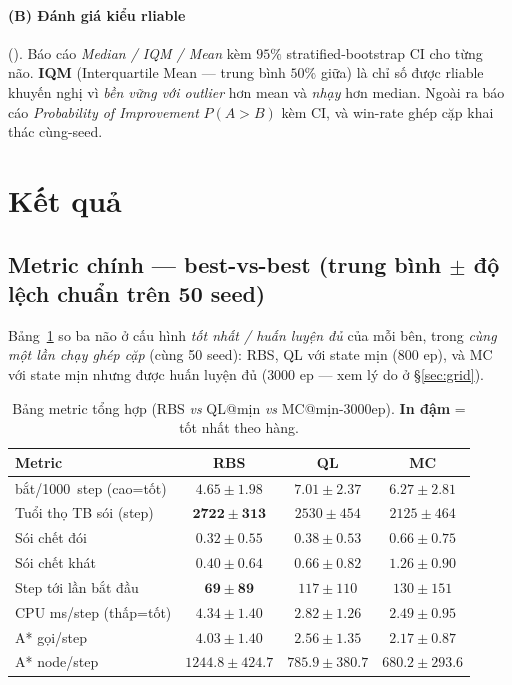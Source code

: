 \documentclass[11pt,a4paper]{article}
\newcommand{\code}[1]{\texttt{\detokenize{#1}}}
\newcommand{\catk}{bắt/1000}
\begin{document}
\paragraph{(B) Đánh giá kiểu rliable} \cite{agarwal2021rliable} (\code{stats_rliable.py}).
Báo cáo \emph{Median / IQM / Mean} kèm $95\%$ stratified-bootstrap CI cho từng não. \textbf{IQM}
(Interquartile Mean --- trung bình $50\%$ giữa) là chỉ số được rliable khuyến nghị vì \emph{bền
vững với outlier} hơn mean và \emph{nhạy} hơn median. Ngoài ra báo cáo \emph{Probability of
Improvement} $P(A>B)$ kèm CI, và win-rate ghép cặp khai thác cùng-seed.

\section{Kết quả}\label{sec:results}

\subsection{Metric chính --- best-vs-best (trung bình $\pm$ độ lệch chuẩn trên 50 seed)}

Bảng~\ref{tab:main} so ba não ở cấu hình \emph{tốt nhất / huấn luyện đủ} của mỗi bên, trong
\emph{cùng một lần chạy ghép cặp} (cùng 50 seed): RBS, QL với state mịn ($800$ ep), và MC với state
mịn nhưng được huấn luyện đủ ($3000$ ep --- xem lý do ở \S\ref{sec:grid}).

\begin{table}[h]
\centering
\caption{Bảng metric tổng hợp (RBS \emph{vs} QL@mịn \emph{vs} MC@mịn-$3000$ep). \textbf{In đậm} = tốt nhất theo hàng.}
\label{tab:main}
\small
\begin{tabular}{lccc}
\toprule
Metric & RBS & QL & MC \\
\midrule
\catk\ step (cao=tốt)   & $4.65\pm1.98$ & $\mathbf{7.01\pm2.37}$ & $6.27\pm2.81$ \\
Tuổi thọ TB sói (step)  & $\mathbf{2722\pm313}$ & $2530\pm454$ & $2125\pm464$ \\
Sói chết đói            & $\mathbf{0.32\pm0.55}$ & $0.38\pm0.53$ & $0.66\pm0.75$ \\
Sói chết khát           & $\mathbf{0.40\pm0.64}$ & $0.66\pm0.82$ & $1.26\pm0.90$ \\
Step tới lần bắt đầu     & $\mathbf{69\pm89}$ & $117\pm110$ & $130\pm151$ \\
CPU ms/step (thấp=tốt)  & $4.34\pm1.40$ & $2.82\pm1.26$ & $\mathbf{2.49\pm0.95}$ \\
A* gọi/step             & $4.03\pm1.40$ & $2.56\pm1.35$ & $\mathbf{2.17\pm0.87}$ \\
A* node/step            & $1244.8\pm424.7$ & $785.9\pm380.7$ & $\mathbf{680.2\pm293.6}$ \\
\bottomrule
\end{tabular}
\end{table}
\end{document}
